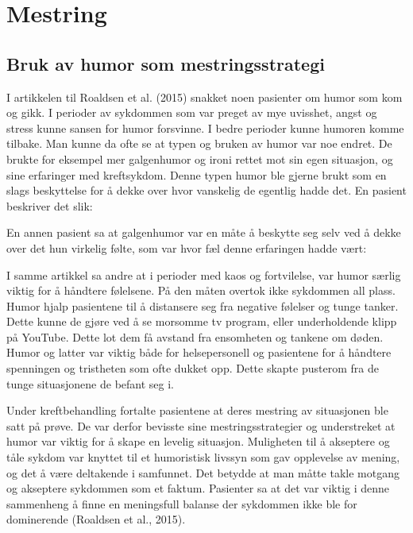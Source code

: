 \section{Mestring}

\subsection{Bruk av humor som mestringsstrategi}

I artikkelen til Roaldsen et al. (2015) snakket noen pasienter om humor som kom
og gikk. I perioder av sykdommen som var preget av mye uvisshet, angst og
stress kunne sansen for humor forsvinne. I bedre perioder kunne humoren komme
tilbake. Man kunne da ofte se at typen og bruken av humor var noe endret. De
brukte for eksempel mer galgenhumor og ironi rettet mot sin egen situasjon, og
sine erfaringer med kreftsykdom. Denne typen humor ble gjerne brukt som en
slags beskyttelse for å dekke over hvor vanskelig de egentlig hadde det. En
pasient beskriver det slik: 

En annen pasient sa at galgenhumor var en måte å beskytte seg selv ved å dekke
over det hun virkelig følte, som var hvor fæl denne erfaringen hadde vært:


I samme artikkel sa andre at i perioder med kaos og fortvilelse, var humor
særlig viktig for å håndtere følelsene. På den måten overtok ikke sykdommen all
plass. Humor hjalp pasientene til å distansere seg fra negative følelser og
tunge tanker. Dette kunne de gjøre ved å se morsomme tv program, eller
underholdende klipp på YouTube. Dette lot dem få avstand fra ensomheten og
tankene om døden. Humor og latter var viktig både for helsepersonell og
pasientene for å håndtere spenningen og tristheten som ofte dukket opp. Dette
skapte pusterom fra de tunge situasjonene de befant seg i.

Under kreftbehandling fortalte pasientene at deres mestring av situasjonen ble
satt på prøve. De var derfor bevisste sine mestringsstrategier og understreket
at humor var viktig for å skape en levelig situasjon. Muligheten til å
akseptere og tåle sykdom var knyttet til et humoristisk livssyn som gav
opplevelse av mening, og det å være deltakende i samfunnet. Det betydde at man
måtte takle motgang og akseptere sykdommen som et faktum. Pasienter sa at det
var viktig i denne sammenheng å finne en meningsfull balanse der sykdommen ikke
ble for dominerende (Roaldsen et al., 2015).

